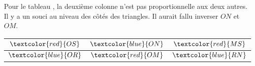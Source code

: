 \begin{corrige}
\begin{multicols}
\begin{enumerate}
            Pour le tableau , la deuxième colonne n'est pas proportionnelle aux deux autres.
            Il y a un souci au niveau des côtés des triangles. Il aurait fallu inverser $ON$ et $OM$.

            \begin{tabular}{c|c|c}
                $\textcolor{red}{OS}$&$\textcolor{blue}{ON}$&$\textcolor{red}{MS}$\\ \hline
                $\textcolor{blue}{OR}$&$\textcolor{red}{OM}$&$\textcolor{blue}{RN}$\\                 
            \end{tabular}
        \end{enumerate}
    \end{multicols}
\end{corrige}

